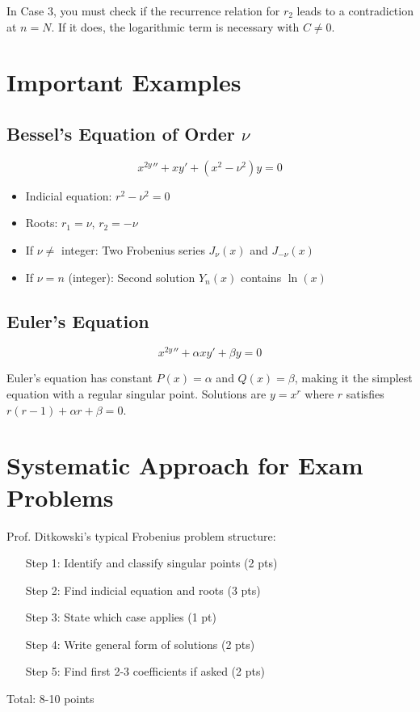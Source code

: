\documentclass[12pt]{article}
\begin{document}
\begin{warning}
In Case 3, you must check if the recurrence relation for $r_{2}$ leads to a contradiction at $n = N$. If it does, the logarithmic term is necessary with $C \neq 0$.
\end{warning}

\section{Important Examples}

\subsection{Bessel's Equation of Order $\nu$}

$$x^{2y}'' + xy' + (x^{2} - \nu^{2})y = 0$$

\begin{frobenius}
\begin{itemize}
\item Indicial equation: $r^{2} - \nu^{2} = 0$
\item Roots: $r_{1} = \nu$, $r_{2} = -\nu$
\item If $\nu \neq$ integer: Two Frobenius series $J_{\nu}(x)$ and $J_{-\nu}(x)$
\item If $\nu = n$ (integer): Second solution $Y_{n}(x)$ contains $\ln(x)$
\end{itemize}
\end{frobenius}

\subsection{Euler's Equation}

$$x^{2y}'' + \alpha xy' + \beta y = 0$$

\begin{insight}
Euler's equation has constant $P(x) = \alpha$ and $Q(x) = \beta$, making it the simplest equation with a regular singular point. Solutions are $y = x^{r}$ where $r$ satisfies $r(r-1) + \alpha r + \beta = 0$.
\end{insight}

\section{Systematic Approach for Exam Problems}

\begin{examtip}
Prof. Ditkowski's typical Frobenius problem structure:
\begin{enumerate}
\item[Step 1:] Identify and classify singular points (2 pts)
\item[Step 2:] Find indicial equation and roots (3 pts)
\item[Step 3:] State which case applies (1 pt)
\item[Step 4:] Write general form of solutions (2 pts)
\item[Step 5:] Find first 2-3 coefficients if asked (2 pts)
\end{enumerate}
Total: 8-10 points
\end{examtip}
\end{document}
